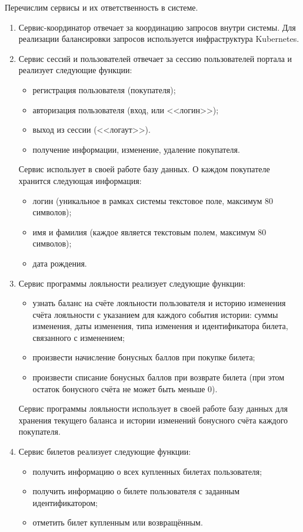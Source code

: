 Перечислим сервисы и их ответственность в системе.
\begin{enumerate}
    \item Сервис-координатор отвечает за координацию запросов внутри системы. Для реализации балансировки запросов используется инфраструктура Kubernetes.
    \item Сервис сессий и пользователей отвечает за сессию пользователей портала и реализует следующие функции:
    \begin{itemize}
        \item регистрация пользователя (покупателя); 
        \item авторизация пользователя (вход, или <<логин>>);
        \item выход из сессии (<<логаут>>).
        \item получение информации, изменение, удаление покупателя.
    \end{itemize}
    
    Сервис использует в своей работе базу данных. О каждом покупателе хранится следующая информация:
    \begin{itemize}
        \item логин (уникальное в рамках системы текстовое поле, максимум 80 символов);
        \item имя и фамилия (каждое является текстовым полем, максимум 80 символов);
        \item дата рождения.
    \end{itemize}
    \item Сервис программы лояльности реализует следующие функции:
    \begin{itemize}
        \item узнать баланс на счёте лояльности пользователя и историю изменения счёта лояльности с указанием для каждого события истории: суммы изменения, даты изменения, типа изменения и идентификатора билета, связанного с изменением; 
        \item произвести начисление бонусных баллов при покупке билета; 
        \item произвести списание бонусных баллов при возврате билета (при этом остаток бонусного счёта не может быть меньше 0).
    \end{itemize}

    Сервис программы лояльности использует в своей работе базу данных для хранения текущего баланса и истории изменений бонусного счёта каждого покупателя.

    \item Сервис билетов реализует следующие функции:
    \begin{itemize}
        \item получить информацию о всех купленных билетах пользователя; 
        \item получить информацию о билете пользователя с заданным идентификатором; 
        \item отметить билет купленным или возвращённым.
    \end{itemize}


\end{enumerate}
